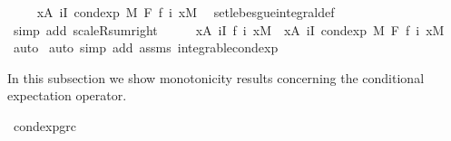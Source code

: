 \begin{isabellebody}
\ \isamarkupfalse%
\ {\isachardoublequoteopen}{\isachardot}{\kern0pt}{\isachardot}{\kern0pt}{\isachardot}{\kern0pt}\ {\isacharequal}{\kern0pt}\ {\isacharparenleft}{\kern0pt}{\isasymintegral}x{\isasymin}A{\isachardot}{\kern0pt}\ {\isacharparenleft}{\kern0pt}{\isasymSum}i{\isasymin}I{\isachardot}{\kern0pt}\ cond{\isacharunderscore}{\kern0pt}exp\ M\ F\ {\isacharparenleft}{\kern0pt}f\ i{\isacharparenright}{\kern0pt}\ x{\isacharparenright}{\kern0pt}{\isasympartial}M{\isacharparenright}{\kern0pt}{\isachardoublequoteclose}\ \isamarkupfalse%
\ set{\isacharunderscore}{\kern0pt}lebesgue{\isacharunderscore}{\kern0pt}integral{\isacharunderscore}{\kern0pt}def\ \isamarkupfalse%
\ {\isacharparenleft}{\kern0pt}simp\ add{\isacharcolon}{\kern0pt}\ scaleR{\isacharunderscore}{\kern0pt}sum{\isacharunderscore}{\kern0pt}right{\isacharparenright}{\kern0pt}\isanewline
\ \ \isamarkupfalse%
\ \isamarkupfalse%
\ {\isachardoublequoteopen}{\isacharparenleft}{\kern0pt}{\isasymintegral}x{\isasymin}A{\isachardot}{\kern0pt}\ {\isacharparenleft}{\kern0pt}{\isasymSum}i{\isasymin}I{\isachardot}{\kern0pt}\ f\ i\ x{\isacharparenright}{\kern0pt}{\isasympartial}M{\isacharparenright}{\kern0pt}\ {\isacharequal}{\kern0pt}\ {\isacharparenleft}{\kern0pt}{\isasymintegral}x{\isasymin}A{\isachardot}{\kern0pt}\ {\isacharparenleft}{\kern0pt}{\isasymSum}i{\isasymin}I{\isachardot}{\kern0pt}\ cond{\isacharunderscore}{\kern0pt}exp\ M\ F\ {\isacharparenleft}{\kern0pt}f\ i{\isacharparenright}{\kern0pt}\ x{\isacharparenright}{\kern0pt}{\isasympartial}M{\isacharparenright}{\kern0pt}{\isachardoublequoteclose}\ \isamarkupfalse%
\ auto\isanewline
{}\isamarkupfalse%
\ {\isacharparenleft}{\kern0pt}auto\ simp\ add{\isacharcolon}{\kern0pt}\ assms\ integrable{\isacharunderscore}{\kern0pt}cond{\isacharunderscore}{\kern0pt}exp{\isacharparenright}{\kern0pt}%
\endisatagproof
{\isafoldproof}%
%
\isadelimproof
%
\endisadelimproof
%
\isadelimdocument
%
\endisadelimdocument
%
\isatagdocument
%
\isamarkuptrue%
%
\endisatagdocument
{\isafolddocument}%
%
\isadelimdocument
%
\endisadelimdocument
%
\begin{isamarkuptext}%
In this subsection we show monotonicity results concerning the conditional expectation operator.%
\end{isamarkuptext}\isamarkuptrue%
\isamarkupfalse%
\ cond{\isacharunderscore}{\kern0pt}exp{\isacharunderscore}{\kern0pt}gr{\isacharunderscore}{\kern0pt}c{\isacharcolon}{\kern0pt}\isanewline

\end{isabellebody}
